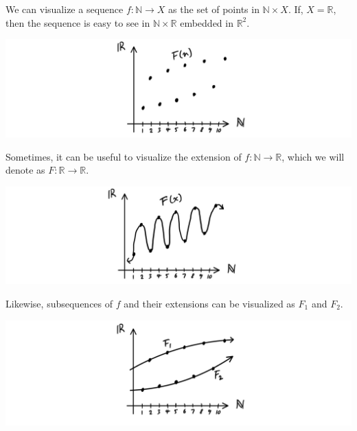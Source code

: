 \documentclass{article}
\theoremstyle{remark}
\theoremstyle{definition}
\begin{document}
We can visualize a sequence $f: \mathbb{N} \longrightarrow X$ as the set of points in $\mathbb{N} \times X$. If, $X = \mathbb{R}$, then the sequence is easy to see in $\mathbb{N} \times \mathbb{R}$ embedded in $\mathbb{R}^2$. 
\begin{center}
    \includegraphics[scale=0.27]{img/Sequence_Visual.jpg}
\end{center}
Sometimes, it can be useful to visualize the extension of $f: \mathbb{N} \longrightarrow \mathbb{R}$, which we will denote as $F: \mathbb{R} \longrightarrow \mathbb{R}$. 
\begin{center}
    \includegraphics[scale=0.27]{img/Sequence_Extension_Visual.jpg}
\end{center}
Likewise, subsequences of $f$ and their extensions can be visualized as $F_1$ and $F_2$. 
\begin{center}
    \includegraphics[scale=0.27]{img/Subsequence_Extension_Visual.PNG}
\end{center}
\end{document}
